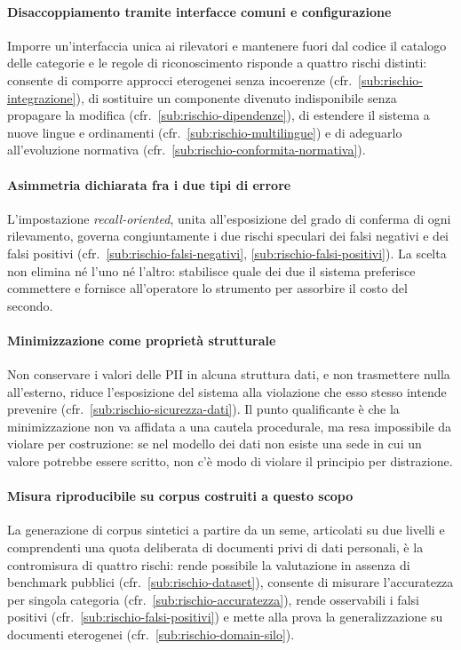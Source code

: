 \paragraph*{Disaccoppiamento tramite interfacce comuni e configurazione} Imporre un'interfaccia unica ai rilevatori e mantenere fuori dal codice il catalogo delle categorie e le regole di riconoscimento risponde a quattro rischi distinti: consente di comporre approcci eterogenei senza incoerenze (cfr.~\ref{sub:rischio-integrazione}), di sostituire un componente divenuto indisponibile senza propagare la modifica (cfr.~\ref{sub:rischio-dipendenze}), di estendere il sistema a nuove lingue e ordinamenti (cfr.~\ref{sub:rischio-multilingue}) e di adeguarlo all'evoluzione normativa (cfr.~\ref{sub:rischio-conformita-normativa}).

\paragraph*{Asimmetria dichiarata fra i due tipi di errore} L'impostazione \textit{recall-oriented}, unita all'esposizione del grado di conferma di ogni rilevamento, governa congiuntamente i due rischi speculari dei falsi negativi e dei falsi positivi (cfr.~\ref{sub:rischio-falsi-negativi}, \ref{sub:rischio-falsi-positivi}). La scelta non elimina né l'uno né l'altro: stabilisce quale dei due il sistema preferisce commettere e fornisce all'operatore lo strumento per assorbire il costo del secondo.

\paragraph*{Minimizzazione come proprietà strutturale} Non conservare i valori delle PII in alcuna struttura dati, e non trasmettere nulla all'esterno, riduce l'esposizione del sistema alla violazione che esso stesso intende prevenire (cfr.~\ref{sub:rischio-sicurezza-dati}). Il punto qualificante è che la minimizzazione non va affidata a una cautela procedurale, ma resa impossibile da violare per costruzione: se nel modello dei dati non esiste una sede in cui un valore potrebbe essere scritto, non c'è modo di violare il principio per distrazione.

\paragraph*{Misura riproducibile su corpus costruiti a questo scopo} La generazione di corpus sintetici a partire da un seme, articolati su due livelli e comprendenti una quota deliberata di documenti privi di dati personali, è la contromisura di quattro rischi: rende possibile la valutazione in assenza di benchmark pubblici (cfr.~\ref{sub:rischio-dataset}), consente di misurare l'accuratezza per singola categoria (cfr.~\ref{sub:rischio-accuratezza}), rende osservabili i falsi positivi (cfr.~\ref{sub:rischio-falsi-positivi}) e mette alla prova la generalizzazione su documenti eterogenei (cfr.~\ref{sub:rischio-domain-silo}).

